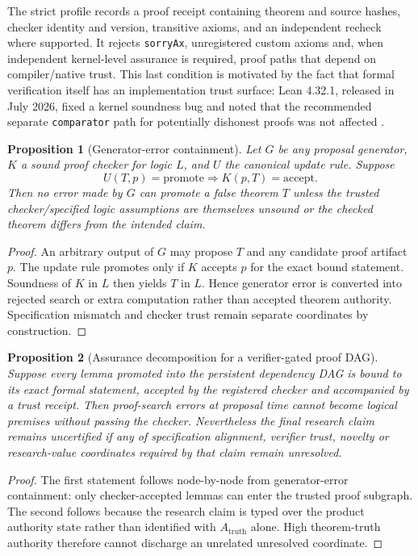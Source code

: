 \documentclass[11pt]{article}
\newtheorem{proposition}{Proposition}
\begin{document}
The strict profile records a proof receipt containing theorem and source hashes, checker identity and version, transitive axioms, and an independent recheck where supported. It rejects \texttt{sorryAx}, unregistered custom axioms and, when independent kernel-level assurance is required, proof paths that depend on compiler/native trust. This last condition is motivated by the fact that formal verification itself has an implementation trust surface: Lean 4.32.1, released in July 2026, fixed a kernel soundness bug and noted that the recommended separate \texttt{comparator} path for potentially dishonest proofs was not affected \cite{lean4321}.

\begin{proposition}[Generator-error containment]
Let $G$ be any proposal generator, $K$ a sound proof checker for logic $L$, and $U$ the canonical update rule. Suppose
\[
U(T,p)=\mathrm{promote}\Longrightarrow K(p,T)=\mathrm{accept}.
\]
Then no error made by $G$ can promote a false theorem $T$ unless the trusted checker/specified logic assumptions are themselves unsound or the checked theorem differs from the intended claim.
\end{proposition}

\begin{proof}
An arbitrary output of $G$ may propose $T$ and any candidate proof artifact $p$. The update rule promotes only if $K$ accepts $p$ for the exact bound statement. Soundness of $K$ in $L$ then yields $T$ in $L$. Hence generator error is converted into rejected search or extra computation rather than accepted theorem authority. Specification mismatch and checker trust remain separate coordinates by construction.
\end{proof}

\begin{proposition}[Assurance decomposition for a verifier-gated proof DAG]
Suppose every lemma promoted into the persistent dependency DAG is bound to its exact formal statement, accepted by the registered checker and accompanied by a trust receipt. Then proof-search errors at proposal time cannot become logical premises without passing the checker. Nevertheless the final research claim remains uncertified if any of specification alignment, verifier trust, novelty or research-value coordinates required by that claim remain unresolved.
\end{proposition}

\begin{proof}
The first statement follows node-by-node from generator-error containment: only checker-accepted lemmas can enter the trusted proof subgraph. The second follows because the research claim is typed over the product authority state rather than identified with $A_{\mathrm{truth}}$ alone. High theorem-truth authority therefore cannot discharge an unrelated unresolved coordinate.
\end{proof}
\end{document}
